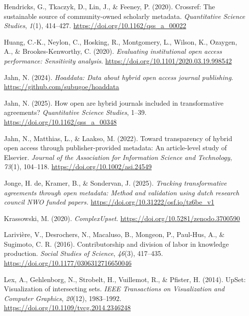 \documentclass[a4paper,man,floatsintext,longtable,noextraspace,10pt]{apa6}
\newlength{\cslhangindent}
\newenvironment{CSLReferences}[2] %
{\begin{list}{}{%
  \setlength{\itemindent}{0pt}
  \setlength{\leftmargin}{0pt}
  \setlength{\parsep}{0pt}
  \ifodd #1
  \setlength{\leftmargin}{\cslhangindent}
  \setlength{\itemindent}{-1\cslhangindent}
  \fi
  \setlength{\itemsep}{#2\baselineskip}}}
{\end{list}}
\begin{document}
\begin{CSLReferences}{1}{0}
Hendricks, G., Tkaczyk, D., Lin, J., \& Feeney, P. (2020). Crossref: The
sustainable source of community-owned scholarly metadata.
\emph{Quantitative Science Studies}, \emph{1}(1), 414--427.
\url{https://doi.org/10.1162/qss_a_00022}

Huang, C.-K., Neylon, C., Hosking, R., Montgomery, L., Wilson, K.,
Ozaygen, A., \& Brookes-Kenworthy, C. (2020). \emph{Evaluating
institutional open access performance: Sensitivity analysis}.
\url{https://doi.org/10.1101/2020.03.19.998542}

Jahn, N. (2024). \emph{Hoaddata: Data about hybrid open access journal
publishing}. \url{https://github.com/subugoe/hoaddata}

Jahn, N. (2025). How open are hybrid journals included in transformative
agreements? \emph{Quantitative Science Studies}, 1--39.
\url{https://doi.org/10.1162/qss_a_00348}

Jahn, N., Matthias, L., \& Laakso, M. (2022). Toward transparency of
hybrid open access through publisher-provided metadata: An article-level
study of {Elsevier}. \emph{Journal of the Association for Information
Science and Technology}, \emph{73}(1), 104--118.
\url{https://doi.org/10.1002/asi.24549}

Jonge, H. de, Kramer, B., \& Sondervan, J. (2025). \emph{Tracking
transformative agreements through open metadata: Method and validation
using dutch research council NWO funded papers.}
\url{https://doi.org/10.31222/osf.io/tz6be_v1}

Krassowski, M. (2020). \emph{ComplexUpset}.
\url{https://doi.org/10.5281/zenodo.3700590}

Larivière, V., Desrochers, N., Macaluso, B., Mongeon, P., Paul-Hus, A.,
\& Sugimoto, C. R. (2016). Contributorship and division of labor in
knowledge production. \emph{Social Studies of Science}, \emph{46}(3),
417--435. \url{https://doi.org/10.1177/0306312716650046}

Lex, A., Gehlenborg, N., Strobelt, H., Vuillemot, R., \& Pfister, H.
(2014). UpSet: Visualization of intersecting sets. \emph{IEEE
Transactions on Visualization and Computer Graphics}, \emph{20}(12),
1983--1992. \url{https://doi.org/10.1109/tvcg.2014.2346248}


\end{CSLReferences}
\end{document}
